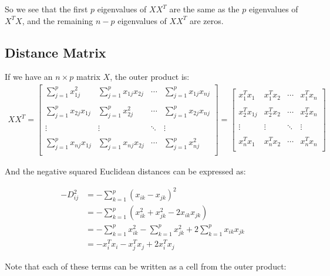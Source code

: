 \documentclass[a4paper]{article}
\begin{document}
So we see that the first $p$ eigenvalues of $XX^T$ are the same as the
$p$ eigenvalues of $X^TX$, and the remaining $n-p$ eigenvalues of
$XX^T$ are zeros.

\subsection{Distance Matrix}
If we have an $n \times p$ matrix $X$, the outer product is:
\begin{align*}
XX^T = 
 \begin{bmatrix}
   \sum_{j=1}^p x_{1j}^2 & \sum_{j=1}^p x_{1j}x_{2j} & \cdots & \sum_{j=1}^p x_{1j}x_{nj}\\\\
   \sum_{j=1}^p x_{2j}x_{1j} & \sum_{j=1}^p x_{2j}^2 & \cdots & \sum_{j=1}^p  x_{2j}x_{nj}\\\\
   \vdots & \vdots & \ddots & \vdots\\\\
   \sum_{j=1}^p x_{nj}x_{1j} & \sum_{j=1}^p x_{nj}x_{2j} & \cdots & \sum_{j=1}^p x_{nj}^2 \\
 \end{bmatrix} = 
 \begin{bmatrix}
   x_1^Tx_1 & x_{1}^Tx_{2} & \cdots & x_{1}^Tx_{n}\\\\
   x_{2}^Tx_{1j} & x_2^Tx_{2} & \cdots & x_{2}^Tx_{n}\\\\
   \vdots & \vdots & \ddots & \vdots\\\\
   x_{n}^Tx_{1} & x_{n}^Tx_{2} & \cdots & x_{n}^Tx_n \\
 \end{bmatrix}  
\end{align*}

And the negative squared Euclidean distances can be expressed as:

\begin{align*}
-D_{ij}^2 &= -\sum_{k=1}^p \left(x_{ik} - x_{jk}\right)^2\\
         &= -\sum_{k=1}^p \left(x_{ik}^2 + x_{jk}^2 - 2x_{ik}x_{jk}\right)\\
         &= -\sum_{k=1}^p x_{ik}^2 - \sum_{k=1}^p x_{jk}^2 + 2\sum_{k=1}^p x_{ik}x_{jk}\\
         &= -x_i^Tx_i - x_j^Tx_j + 2x_i^Tx_j
\end{align*}

Note that each of these terms can be written as a cell from the outer product:
\end{document}
